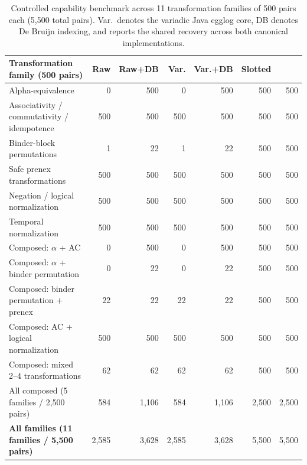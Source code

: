 \begin{table}[H]
\centering
\caption{Controlled capability benchmark across 11 transformation families of
500 pairs each (5,500 total pairs). Var.\ denotes the variadic Java egglog
core, DB denotes De Bruijn indexing, and \CanDis{} reports the shared recovery
across both canonical implementations.}
\label{tab:capability-benchmark}
\scriptsize
\setlength{\tabcolsep}{2.4pt}
\begin{tabular}{@{}lrrrrrr@{}}
\toprule
Transformation family (500 pairs) & Raw & Raw+DB & Var. & Var.+DB & Slotted & \CanDis{}\\
\midrule
Alpha-equivalence & 0 & 500 & 0 & 500 & 500 & 500\\
Associativity / commutativity / idempotence & 500 & 500 & 500 & 500 & 500 & 500\\
Binder-block permutations & 1 & 22 & 1 & 22 & 500 & 500\\
Safe prenex transformations & 500 & 500 & 500 & 500 & 500 & 500\\
Negation / logical normalization & 500 & 500 & 500 & 500 & 500 & 500\\
Temporal normalization & 500 & 500 & 500 & 500 & 500 & 500\\
Composed: $\alpha$ + AC & 0 & 500 & 0 & 500 & 500 & 500\\
Composed: $\alpha$ + binder permutation & 0 & 22 & 0 & 22 & 500 & 500\\
Composed: binder permutation + prenex & 22 & 22 & 22 & 22 & 500 & 500\\
Composed: AC + logical normalization & 500 & 500 & 500 & 500 & 500 & 500\\
Composed: mixed 2--4 transformations & 62 & 62 & 62 & 62 & 500 & 500\\
\midrule
All composed (5 families / 2,500 pairs) & 584 & 1,106 & 584 & 1,106 & 2,500 & 2,500\\
\textbf{All families (11 families / 5,500 pairs)} & 2,585 & 3,628 & 2,585 & 3,628 & 5,500 & 5,500\\
\bottomrule
\end{tabular}
\end{table}

